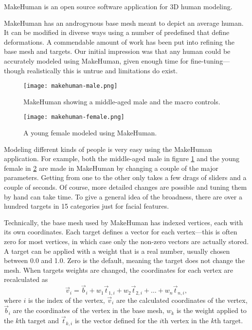 MakeHuman \citep{makehuman} is an open source software application for 3D human modeling.

MakeHuman has an androgynous base mesh meant to depict an average human. It can be modified in diverse ways using a number of predefined  that define deformations. A commendable amount of work has been put into refining the base mesh and targets. Our initial impression was that any human could be accurately modeled using MakeHuman, given enough time for fine-tuning---though realistically this is untrue and limitations do exist.

\begin{figure}
    \centering
    \texttt{[image: makehuman-male.png]}
    \caption{MakeHuman showing a middle-aged male and the macro controls.}
    \label{fig:makehuman-male}
\end{figure}

\begin{figure}
    \centering
    \texttt{[image: makehuman-female.png]}
    \caption{A young female modeled using MakeHuman.}
    \label{fig:makehuman-female}
\end{figure}

Modeling different kinds of people is very easy using the MakeHuman application. For example, both the middle-aged male in figure \ref{fig:makehuman-male} and the young female in \ref{fig:makehuman-female} are made in MakeHuman by changing a couple of the major parameters. Getting from one to the other only takes a few drags of sliders and a couple of seconds. Of course, more detailed changes are possible and tuning them by hand can take time. To give a general idea of the broadness, there are over a hundred targets in 15 categories just for facial features.

Technically, the base mesh used by MakeHuman has indexed vertices, each with its own coordinates. Each target defines a vector for each vertex---this is often zero for most vertices, in which case only the non-zero vectors are actually stored. A target can be applied with a weight that is a real number, usually chosen between 0.0 and 1.0. Zero is the default, meaning the target does not change the mesh. When targets weights are changed, the coordinates for each vertex are recalculated as
%
\begin{equation*}
    \vec{v}_i = \vec{b}_i + w_1 \vec{t}_{1,i} + w_2 \vec{t}_{2,i} + \dots  + w_n \vec{t}_{n,i},
\end{equation*}
%
where $i$ is the index of the vertex, $\vec{v}_i$ are the calculated coordinates of the vertex, $\vec{b}_i$ are the coordinates of the vertex in the base mesh, $w_k$ is the weight applied to the $k$th target and $\vec{t}_{k,i}$ is the vector defined for the $i$th vertex in the $k$th target.

